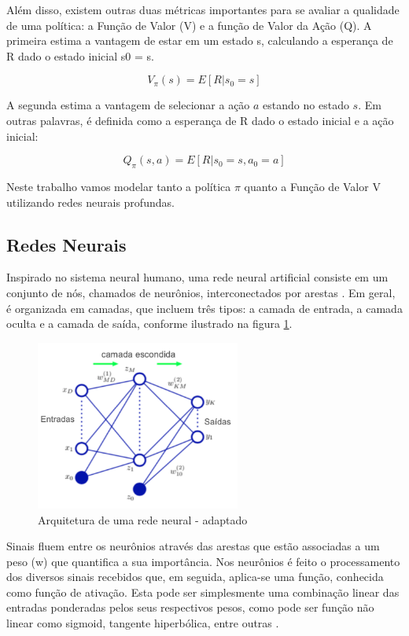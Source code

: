 Além disso, existem outras duas métricas importantes para se avaliar a qualidade de uma política: a Função de Valor (V) e a função de Valor da Ação (Q). A primeira estima a vantagem de estar em um estado s, calculando a esperança de R dado o estado inicial s0 = s. 

\begin{equation}
    V_\pi(s) = E[R|s_0 = s]
\end{equation}

A segunda estima a vantagem de selecionar a ação $a$ estando no estado $s$. Em outras palavras, é definida como a esperança de R dado o estado inicial e a ação inicial:

\begin{equation}
    Q_\pi(s,a) = E[R|s_0 = s, a_0 = a]
\end{equation}


Neste trabalho vamos modelar tanto a política $\pi$ quanto a Função de Valor V utilizando redes neurais profundas. 

\subsection{Redes Neurais}
Inspirado no sistema neural humano, uma rede neural artificial consiste em um conjunto de nós, chamados de neurônios, interconectados por arestas \cite{Bishop}. 
Em geral, é organizada em camadas, que incluem três tipos: a camada de entrada, a camada oculta e a camada de saída, conforme ilustrado na figura \ref{arqNN}.

\begin{figure}[H]
     \centering
     \includegraphics[width=0.6\textwidth]{figuras/RedeNeural.png}
     \caption{Arquitetura de uma rede neural - \cite{Bishop} adaptado}
     \label{arqNN}
\end{figure}

Sinais fluem entre os neurônios através das arestas que estão associadas a um peso (w) que quantifica a sua importância. 
Nos neurônios é feito o processamento dos diversos sinais recebidos que, em seguida, aplica-se uma função, conhecida como função de ativação. 
Esta pode ser simplesmente uma combinação linear das entradas ponderadas pelos seus respectivos pesos, como pode ser função não linear como  sigmoid, 
tangente hiperbólica, entre outras \cite{Bishop}.   

